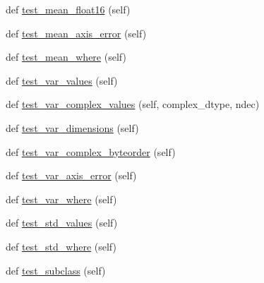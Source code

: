 \begin{DoxyCompactItemize}
\item 
def \hyperlink{classnumpy_1_1core_1_1tests_1_1test__multiarray_1_1TestStats_a9547c013b142d9495687ec81780b7b3e}{test\+\_\+mean\+\_\+float16} (self)
\item 
def \hyperlink{classnumpy_1_1core_1_1tests_1_1test__multiarray_1_1TestStats_a4dc5e0b0b2c1535e24590dd41561bc68}{test\+\_\+mean\+\_\+axis\+\_\+error} (self)
\item 
def \hyperlink{classnumpy_1_1core_1_1tests_1_1test__multiarray_1_1TestStats_acd8d2caf80e3358c228af3088f919883}{test\+\_\+mean\+\_\+where} (self)
\item 
def \hyperlink{classnumpy_1_1core_1_1tests_1_1test__multiarray_1_1TestStats_aaa75c96b5f414211b49d1d3a23f16aeb}{test\+\_\+var\+\_\+values} (self)
\item 
def \hyperlink{classnumpy_1_1core_1_1tests_1_1test__multiarray_1_1TestStats_a3474df3ebcdacfe49316f07bf24d56bd}{test\+\_\+var\+\_\+complex\+\_\+values} (self, complex\+\_\+dtype, ndec)
\item 
def \hyperlink{classnumpy_1_1core_1_1tests_1_1test__multiarray_1_1TestStats_ae7243cfb83f067fb1fce51e6c436eeac}{test\+\_\+var\+\_\+dimensions} (self)
\item 
def \hyperlink{classnumpy_1_1core_1_1tests_1_1test__multiarray_1_1TestStats_af08e0b3eee238cf77df383af0b07ec11}{test\+\_\+var\+\_\+complex\+\_\+byteorder} (self)
\item 
def \hyperlink{classnumpy_1_1core_1_1tests_1_1test__multiarray_1_1TestStats_a729d78da7cf355ae1fe863cb8117db0b}{test\+\_\+var\+\_\+axis\+\_\+error} (self)
\item 
def \hyperlink{classnumpy_1_1core_1_1tests_1_1test__multiarray_1_1TestStats_acfe5f261bf8a75d843bf76135e62b2bc}{test\+\_\+var\+\_\+where} (self)
\item 
def \hyperlink{classnumpy_1_1core_1_1tests_1_1test__multiarray_1_1TestStats_acd78e0f49bfde3dfe71b9b7968d50e70}{test\+\_\+std\+\_\+values} (self)
\item 
def \hyperlink{classnumpy_1_1core_1_1tests_1_1test__multiarray_1_1TestStats_a3f7c1c5422fe2b52aad2fba468548c41}{test\+\_\+std\+\_\+where} (self)
\item 
def \hyperlink{classnumpy_1_1core_1_1tests_1_1test__multiarray_1_1TestStats_a05bb9489afe55a1678ca8d2dac2f817a}{test\+\_\+subclass} (self)
\end{DoxyCompactItemize}
